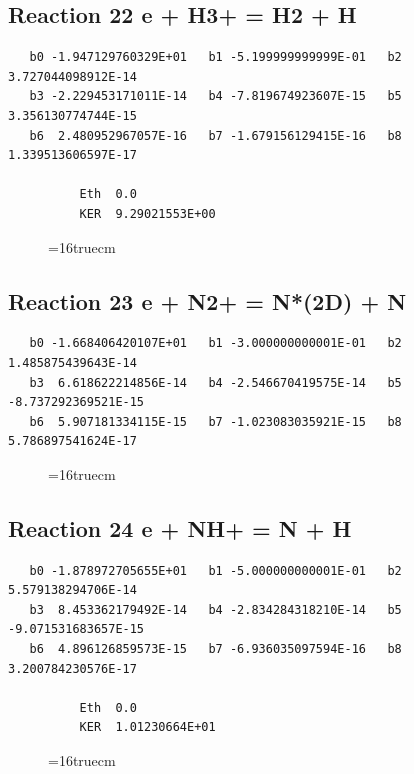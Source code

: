\documentclass[12pt,dvipdfm]{article}
\begin{document}
\subsection{
Reaction 22 e + H3+ = H2 + H }
\begin{small}\begin{verbatim}
   b0 -1.947129760329E+01   b1 -5.199999999999E-01   b2  3.727044098912E-14
   b3 -2.229453171011E-14   b4 -7.819674923607E-15   b5  3.356130774744E-15
   b6  2.480952967057E-16   b7 -1.679156129415E-16   b8  1.339513606597E-17

          Eth  0.0
          KER  9.29021553E+00

\end{verbatim}\end{small}
\begin{figure}[h!] \label{n2rates}
\epsfxsize=16truecm
\end{figure}
\newpage

\subsection{
Reaction 23 e + N2+ = N*(2D) + N }
\begin{small}\begin{verbatim}
   b0 -1.668406420107E+01   b1 -3.000000000001E-01   b2  1.485875439643E-14
   b3  6.618622214856E-14   b4 -2.546670419575E-14   b5 -8.737292369521E-15
   b6  5.907181334115E-15   b7 -1.023083035921E-15   b8  5.786897541624E-17
\end{verbatim}\end{small}
\begin{figure}[h!] \label{n2rates}
\epsfxsize=16truecm
\end{figure}
\newpage

\subsection{
Reaction 24 e + NH+ = N + H }
\begin{small}\begin{verbatim}
   b0 -1.878972705655E+01   b1 -5.000000000001E-01   b2  5.579138294706E-14
   b3  8.453362179492E-14   b4 -2.834284318210E-14   b5 -9.071531683657E-15
   b6  4.896126859573E-15   b7 -6.936035097594E-16   b8  3.200784230576E-17

          Eth  0.0
          KER  1.01230664E+01

\end{verbatim}\end{small}
\begin{figure}[h!] \label{n2rates}
\epsfxsize=16truecm
\end{figure}
\newpage
\end{document}
